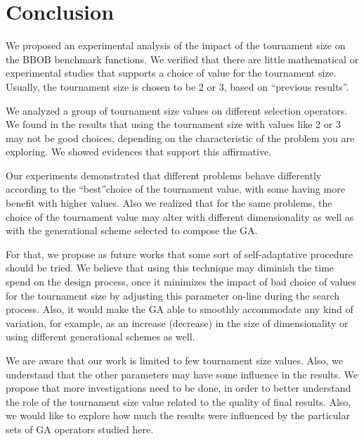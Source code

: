 \section{Conclusion}
\label{sec:conclusion}


We proposed an experimental analysis of the impact of the tournament size on the BBOB benchmark functions. We verified that there are little mathematical or experimental studies that supports a choice of value for the tournament size. Usually, the tournament size is chosen to be 2 or 3, based on ``previous results''. 
 
We analyzed a group of tournament size values on different selection operators. We found in the results that using the tournament size with values like 2 or 3 may not be good choices, depending on the characteristic of the problem you are exploring. We showed evidences that support this affirmative. 

Our experiments demonstrated that different problems behave differently according to the ``best''choice of the tournament value, with some having more benefit with higher values. Also we realized that for the same problems, the choice of the tournament value may alter with different dimensionality as well as with the generational scheme selected to compose the GA.

For that, we propose as future works that some sort of self-adaptative procedure should be tried. We believe that using this technique may diminish the time spend on the design process, once it minimizes the impact of bad choice of values for the tournament size by adjusting this parameter on-line during the search process. Also, it would make the GA able to smoothly accommodate any kind of variation, for example, as an increase (decrease) in the size of dimensionality or using different generational schemes as well.

We are aware that our work is limited to few tournament size values. Also, we understand that the other parameters may have some influence in the results. We propose that more investigations need to be done, in order to better understand the role of the tournament size value related to the quality of final results. Also, we would like to explore how much the results were influenced by the particular sets of GA operators studied here.


